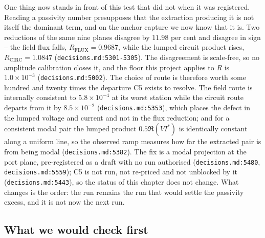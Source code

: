 One thing now stands in front of this test that did not when it was registered. Reading a passivity number
presupposes that the extraction producing it is not itself the dominant term, and on the anchor capture we now
know that it is. Two reductions of the same nine planes disagree by $11.98$ per cent and disagree in sign --
the field flux falls, $R_{\mathrm{FLUX}} = 0.9687$, while the lumped circuit product rises,
$R_{\mathrm{CIRC}} = 1.0847$ (\texttt{decisions.md:5301-5305}). The disagreement is scale-free, so no
amplitude calibration closes it, and the floor this project applies to $R$ is $1.0\times10^{-3}$
(\texttt{decisions.md:5002}). The choice of route is therefore worth some hundred and twenty times the
departure C5 exists to resolve. The field route is internally consistent to $5.8\times10^{-4}$ at its worst
station while the circuit route departs from it by $8.5\times10^{-2}$ (\texttt{decisions.md:5353}), which
places the defect in the lumped voltage and current and not in the flux reduction; and for a consistent
modal pair the lumped product $0.5\Re(V I^{*})$ is identically constant along a uniform line, so the
observed ramp measures how far the extracted pair is from being modal (\texttt{decisions.md:5382}). The fix
is a modal projection at the port plane, pre-registered as a draft with no run authorised
(\texttt{decisions.md:5480}, \texttt{decisions.md:5559}); C5 is not run, not re-priced and not unblocked by
it (\texttt{decisions.md:5443}), so the status of this chapter does not change. What changes is the order:
the run remains the run that would settle the passivity excess, and it is not now the next run.

\subsection{What we would check first}
\label{sec:openproblem-six}

